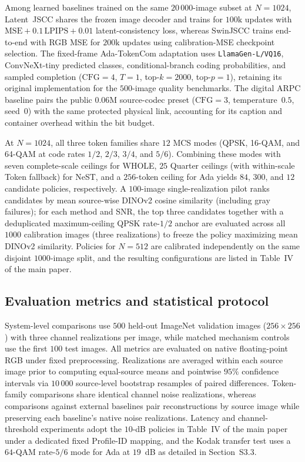 \documentclass[10pt,letterpaper]{article}
\begin{document}
Among learned baselines trained on the same $20\,000$-image subset at $N=1024$, Latent~JSCC shares the frozen image decoder and trains for $100\mathrm{k}$ updates with $\mathrm{MSE}+0.1\,\mathrm{LPIPS}+0.01$ latent-consistency loss, whereas SwinJSCC trains end-to-end with RGB MSE for $200\mathrm{k}$ updates using calibration-MSE checkpoint selection. The fixed-frame Ada-TokenCom adaptation uses \texttt{LlamaGen-L/VQ16}, ConvNeXt-tiny predicted classes, conditional-branch coding probabilities, and sampled completion ($\mathrm{CFG}=4$, $T=1$, top-$k=2000$, top-$p=1$), retaining its original implementation for the $500$-image quality benchmarks. The digital ARPC baseline pairs the public $0.06\mathrm{M}$ source-codec preset ($\mathrm{CFG}=3$, temperature~$0.5$, seed~$0$) with the same protected physical link, accounting for its caption and container overhead within the bit budget.

At $N=1024$, all three token families share $12$ MCS modes (QPSK, 16-QAM, and 64-QAM at code rates $1/2$, $2/3$, $3/4$, and $5/6$). Combining these modes with seven complete-scale ceilings for WHOLE, $25$ Quarter ceilings (with within-scale Token fallback) for NeST, and a $256$-token ceiling for Ada yields $84$, $300$, and $12$ candidate policies, respectively. A $100$-image single-realization pilot ranks candidates by mean source-wise DINOv2 cosine similarity (including gray failures); for each method and SNR, the top three candidates together with a deduplicated maximum-ceiling QPSK rate-$1/2$ anchor are evaluated across all $1000$ calibration images (three realizations) to freeze the policy maximizing mean DINOv2 similarity. Policies for $N=512$ are calibrated independently on the same disjoint $1000$-image split, and the resulting configurations are listed in Table~IV of the main paper.

\subsection{Evaluation metrics and statistical protocol}
System-level comparisons use $500$ held-out ImageNet validation images ($256\times 256$) with three channel realizations per image, while matched mechanism controls use the first $100$ test images. All metrics are evaluated on native floating-point RGB under fixed preprocessing. Realizations are averaged within each source image prior to computing equal-source means and pointwise $95\%$ confidence intervals via $10\,000$ source-level bootstrap resamples of paired differences. Token-family comparisons share identical channel noise realizations, whereas comparisons against external baselines pair reconstructions by source image while preserving each baseline's native noise realizations. Latency and channel-threshold experiments adopt the $10$-dB policies in Table~IV of the main paper under a dedicated fixed Profile-ID mapping, and the Kodak transfer test uses a $64$-QAM rate-$5/6$ mode for Ada at $19$~dB as detailed in Section~S3.3.
\end{document}
